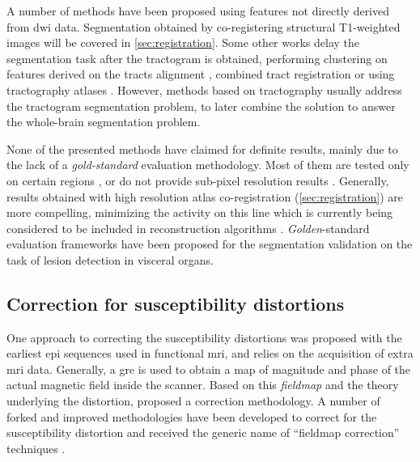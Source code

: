 A number of methods have been proposed using features not directly derived from \gls{dwi} data.
Segmentation obtained by co-registering structural T1-weighted images will be covered in 
\autoref{sec:registration}. Some other works delay the segmentation task after the tractogram 
is obtained, performing clustering on features derived on the tracts alignment 
\citep{jonasson_white_2005}, combined tract registration \citep{mayer_supervised_2011} or using
tractography atlases \citep{odonnell_automatic_2007}. However, methods based on tractography
usually address the tractogram segmentation problem, to later combine the solution to 
answer the whole-brain segmentation problem.

None of the presented methods have claimed for definite results, mainly due to the lack of 
a \emph{gold-standard} evaluation methodology. Most of them are tested only on certain
regions , or do not provide sub-pixel resolution results
\citep{hadjiprocopis_unbiased_2005,liu_brain_2007,awate_multivariate_2008,lu_segmentation_2008,
han_experimental_2009}. Generally, results obtained with high resolution atlas co-registration
(\autoref{sec:registration}) are more compelling, minimizing the activity on this line which is 
currently being considered to be included in reconstruction algorithms 
\citep{kumazawa_improvement_2013}. \emph{Golden}-standard evaluation frameworks have been 
proposed for the segmentation validation \citep{jha_task-based_2012} on the task of lesion 
detection in visceral organs.

\subsection{Correction for susceptibility distortions}
\label{sec:distortion}

One approach to correcting the susceptibility distortions was proposed
with the earliest \gls{epi} sequences used in functional \gls{mri}, and
relies on the acquisition of extra \gls{mri} data. Generally, a \gls{gre} is used to 
obtain a map of magnitude and phase of the actual magnetic field inside the
scanner. Based on this \emph{fieldmap} and the theory underlying the 
distortion, \citep{jezzard_characterization_2005} proposed a correction 
methodology. A number of forked and improved methodologies have been 
developed to correct for the susceptibility distortion and received the
generic name of ``fieldmap correction'' techniques \cite{hsu_correction_2009,
reber_correction_2005}.

